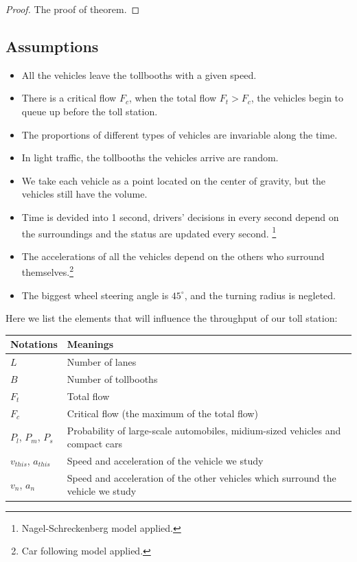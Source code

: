 \documentclass{mcmthesis}
\begin{document}
\begin{proof}
The proof of theorem.
\end{proof}

\subsection{Assumptions}

\begin{itemize}
	\item All the vehicles leave the tollbooths with a given speed.
	\item There is a critical flow $F_c$, when the total flow  $F_t>F_c$, the vehicles begin to queue up before the toll station.
	\item The proportions of different types of vehicles are invariable along the time.
	\item In light traffic, the tollbooths the vehicles arrive are random.
	\item We take each vehicle as a point located on the center of gravity, but the vehicles still have the volume.
    \item Time is devided into 1 second, drivers' decisions in every second depend on the surroundings and the status are updated every second. \footnote{Nagel-Schreckenberg model applied.}
	\item The accelerations of all the vehicles depend on the others who surround themselves.\footnote{Car following model applied.}
	\item The biggest wheel steering angle is $45^{\circ}$, and the turning radius is negleted.
\end{itemize}



Here we list the elements that will influence the throughput of our toll station:

\begin{tabular}{|m{7cm}<{\centering}|p{7cm}<{\centering}|}
	\hline
	Notations & Meanings \\
	\hline
	 $L$ &  Number of lanes \\
	\hline
	 $B$ &  Number of tollbooths\\
	 \hline
     $F_t$ & 	 Total flow\\
     \hline
     $F_c$ & Critical flow (the maximum of the total flow)\\
     \hline
     $P_l$,  $P_m$, $P_s$ & Probability of large-scale automobiles, midium-sized vehicles and compact cars\\
     \hline
     $v_{this}$, $a_{this}$ & Speed and acceleration of the vehicle we study\\
     \hline
      $v_n$, $a_n$ &  Speed and acceleration of the other vehicles which surround the vehicle we study\\
   \hline
     
\end{tabular}
\end{document}
